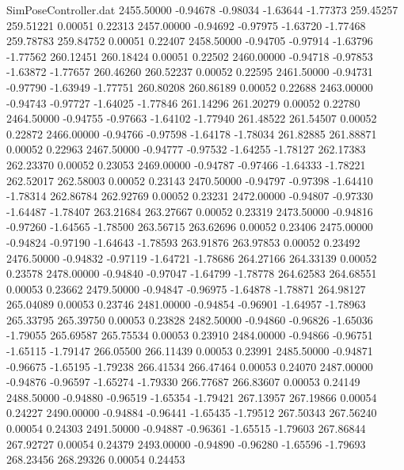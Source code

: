 \begin{filecontents}{SimPoseController.dat}
2455.50000   -0.94678   -0.98034    -1.63644   -1.77373  259.45257  259.51221    0.00051    0.22313
2457.00000   -0.94692   -0.97975    -1.63720   -1.77468  259.78783  259.84752    0.00051    0.22407
2458.50000   -0.94705   -0.97914    -1.63796   -1.77562  260.12451  260.18424    0.00051    0.22502
2460.00000   -0.94718   -0.97853    -1.63872   -1.77657  260.46260  260.52237    0.00052    0.22595
2461.50000   -0.94731   -0.97790    -1.63949   -1.77751  260.80208  260.86189    0.00052    0.22688
2463.00000   -0.94743   -0.97727    -1.64025   -1.77846  261.14296  261.20279    0.00052    0.22780
2464.50000   -0.94755   -0.97663    -1.64102   -1.77940  261.48522  261.54507    0.00052    0.22872
2466.00000   -0.94766   -0.97598    -1.64178   -1.78034  261.82885  261.88871    0.00052    0.22963
2467.50000   -0.94777   -0.97532    -1.64255   -1.78127  262.17383  262.23370    0.00052    0.23053
2469.00000   -0.94787   -0.97466    -1.64333   -1.78221  262.52017  262.58003    0.00052    0.23143
2470.50000   -0.94797   -0.97398    -1.64410   -1.78314  262.86784  262.92769    0.00052    0.23231
2472.00000   -0.94807   -0.97330    -1.64487   -1.78407  263.21684  263.27667    0.00052    0.23319
2473.50000   -0.94816   -0.97260    -1.64565   -1.78500  263.56715  263.62696    0.00052    0.23406
2475.00000   -0.94824   -0.97190    -1.64643   -1.78593  263.91876  263.97853    0.00052    0.23492
2476.50000   -0.94832   -0.97119    -1.64721   -1.78686  264.27166  264.33139    0.00052    0.23578
2478.00000   -0.94840   -0.97047    -1.64799   -1.78778  264.62583  264.68551    0.00053    0.23662
2479.50000   -0.94847   -0.96975    -1.64878   -1.78871  264.98127  265.04089    0.00053    0.23746
2481.00000   -0.94854   -0.96901    -1.64957   -1.78963  265.33795  265.39750    0.00053    0.23828
2482.50000   -0.94860   -0.96826    -1.65036   -1.79055  265.69587  265.75534    0.00053    0.23910
2484.00000   -0.94866   -0.96751    -1.65115   -1.79147  266.05500  266.11439    0.00053    0.23991
2485.50000   -0.94871   -0.96675    -1.65195   -1.79238  266.41534  266.47464    0.00053    0.24070
2487.00000   -0.94876   -0.96597    -1.65274   -1.79330  266.77687  266.83607    0.00053    0.24149
2488.50000   -0.94880   -0.96519    -1.65354   -1.79421  267.13957  267.19866    0.00054    0.24227
2490.00000   -0.94884   -0.96441    -1.65435   -1.79512  267.50343  267.56240    0.00054    0.24303
2491.50000   -0.94887   -0.96361    -1.65515   -1.79603  267.86844  267.92727    0.00054    0.24379
2493.00000   -0.94890   -0.96280    -1.65596   -1.79693  268.23456  268.29326    0.00054    0.24453

\end{filecontents}
